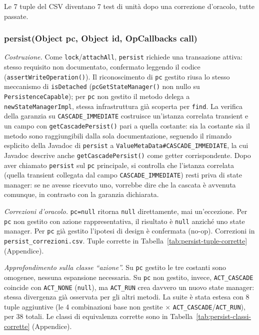 Le 7 tuple del CSV diventano 7 test di unità dopo una correzione d'oracolo, tutte passate.

\subsubsection{persist(Object pc, Object id, OpCallbacks call)}

\textit{Costruzione.} Come \texttt{lock}/\texttt{attachAll}, \texttt{persist} richiede una
transazione attiva: stesso requisito non documentato, confermato leggendo il codice
(\texttt{assertWriteOperation()}). Il riconoscimento di \texttt{pc}
gestito riusa lo stesso meccanismo di \texttt{isDetached} (\texttt{pcGetStateManager()} non
nullo su \texttt{PersistenceCapable}); per \texttt{pc} non gestito il metodo delega a
\texttt{newStateManagerImpl}, stessa infrastruttura già scoperta per \texttt{find}. La verifica
della garanzia su \texttt{CASCADE\_IMMEDIATE} costruisce un'istanza correlata transient e un
campo con \texttt{getCascadePersist()} pari a quella costante: sia la costante sia il metodo
sono raggiungibili dalla sola documentazione, seguendo il rimando esplicito della Javadoc di
\texttt{persist} a \texttt{ValueMetaData\#CASCADE\_IMMEDIATE}, la cui Javadoc descrive anche
\texttt{getCascadePersist()} come getter corrispondente. Dopo aver chiamato \texttt{persist} sul
\texttt{pc} principale, si controlla che l'istanza correlata (quella transient collegata dal
campo \texttt{CASCADE\_IMMEDIATE}) resti priva di state manager: se ne avesse ricevuto uno,
vorrebbe dire che la cascata è avvenuta comunque, in contrasto con la garanzia dichiarata.

\textit{Correzioni d'oracolo.} \texttt{pc=null} ritorna \texttt{null} direttamente, mai
un'eccezione. Per \texttt{pc} non gestito con azione rappresentativa, il risultato è \texttt{null}
anziché uno state manager. Per \texttt{pc} già gestito l'ipotesi di design è confermata (no-op).
Correzioni in \texttt{persist\_correzioni.csv}. Tuple corrette in
Tabella~\ref{tab:persist-tuple-corrette} (Appendice).

\textit{Approfondimento sulla classe ``azione''.} Su \texttt{pc} gestito le tre costanti sono
omogenee, nessuna espansione necessaria. Su \texttt{pc} non gestito, invece,
\texttt{ACT\_CASCADE} coincide con \texttt{ACT\_NONE} (\texttt{null}), ma \texttt{ACT\_RUN} crea
davvero un nuovo state manager: stessa divergenza già osservata per gli altri metodi. La suite è
stata estesa con 8 tuple aggiuntive (le 4 combinazioni base non gestite $\times$
\texttt{ACT\_CASCADE}/\texttt{ACT\_RUN}), per 38 totali. Le classi di equivalenza corrette sono
in Tabella~\ref{tab:persist-classi-corrette} (Appendice).

